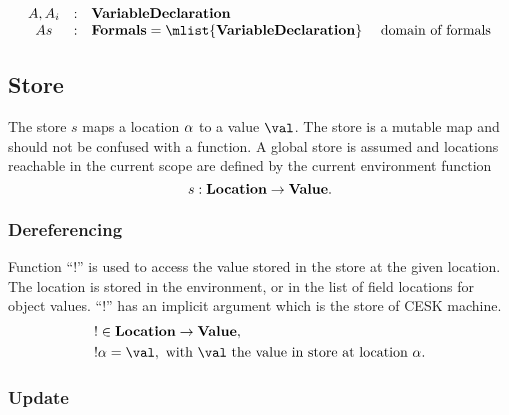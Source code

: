 \documentclass[a4paper,oneside]{article}
\begin{document}
\[
  \begin{array}{ccll}
    \formal, \formali{i} & : & \dvardecl\\
    \formals & : & \dformals = \mlist{\dvardecl} &\text{ domain of formals}\\

  \end{array}
\]

\newcommand{\expressionmeta}{\ensuremath{\mathit{E}}}
\newcommand{\expressionsmeta}{\expressionmeta{s}}
\newcommand{\variablemeta}{\ensuremath{\mathit{X}}}
\newcommand{\boolmeta}{\ensuremath{\mathit{B}}}
\newcommand{\integermeta}{\ensuremath{\mathit{I}}}
\newcommand{\doublemeta}{\ensuremath{\mathit{D}}}
\newcommand{\stringmeta}{\ensuremath{\mathit{S}}}
\newcommand{\idmeta}{\ensuremath{\mathit{X}}}
\newcommand{\membermeta}{\ensuremath{\mathit{M}}}
\newcommand{\typemeta}{\ensuremath{\mathit{T}}}
\newcommand{\statementmeta}{\ensuremath{\mathit{\stmt}}}
\newcommand{\labelmeta}{\ensuremath{\mathit{\tt{L}}}}

\subsection{Store}
\label{subsec:store-definition}

The store $s$ maps a location $\alpha$ to a value $\val$.
The store is a mutable map and should not be confused with a function.
A global store is assumed and locations reachable in the current scope are defined by the current environment function
\[
    s : \mathbf{Location} \rightarrow \mathbf{Value}.
\]


\subsubsection{Dereferencing}
\label{subsubsection:dereferecing}

\newcommand{\deref}[1]{!#1}
Function ``$\deref{}$'' is used to access the value stored in the store at the given location.
The location is stored in the environment, or in the list of field locations for object values.
``$\deref{}$'' has an implicit argument which is the store of CESK machine.
\begin{align*}
    &\deref{} \in \dlocation \rightarrow \dval,\\
    &\deref{\loc} =  \val, \text{ with $\val$ the value in store at location } \loc.
\end{align*}


\subsubsection{Update}
\label{subsubsec:store-update}
\end{document}
